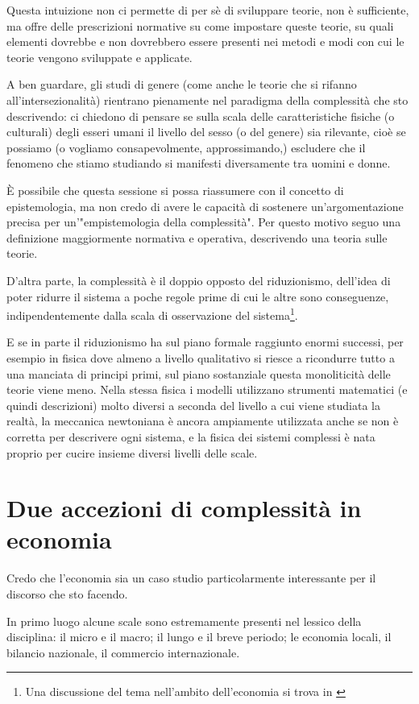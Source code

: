 \documentclass[a4paper, headings=standardclasses]{scrartcl}
\begin{document}
Questa intuizione non ci permette di per sè di sviluppare teorie, non è sufficiente, ma offre delle prescrizioni normative su come impostare queste teorie, su quali elementi dovrebbe e non dovrebbero essere presenti nei metodi e modi con cui le teorie vengono sviluppate e applicate.

A ben guardare, gli studi di genere (come anche le teorie che si rifanno all'intersezionalità) rientrano pienamente nel paradigma della complessità che sto descrivendo: ci chiedono di pensare se sulla scala delle caratteristiche fisiche (o culturali) degli esseri umani il livello del sesso (o del genere) sia rilevante, cioè se possiamo (o vogliamo consapevolmente, approssimando,) escludere che il fenomeno che stiamo studiando si manifesti diversamente tra uomini e donne.

È possibile che questa sessione si possa riassumere con il concetto di epistemologia, ma non credo di avere le capacità di sostenere un'argomentazione precisa per un'"empistemologia della complessità". Per questo motivo seguo una definizione maggiormente normativa e operativa, descrivendo una teoria sulle teorie.

D'altra parte, la complessità è il doppio opposto del riduzionismo, dell'idea di poter ridurre il sistema a poche regole prime di cui le altre sono conseguenze, indipendentemente dalla scala di osservazione del sistema\footnote{Una discussione del tema nell'ambito dell'economia si trova in \textcite{fontana2010}}.

E se in parte il riduzionismo ha sul piano formale raggiunto enormi successi, per esempio in fisica dove almeno a livello qualitativo si riesce a ricondurre tutto a una manciata di principi primi, sul piano sostanziale questa monoliticità delle teorie viene meno.
Nella stessa fisica i modelli utilizzano strumenti matematici (e quindi descrizioni) molto diversi a seconda del livello a cui viene studiata la realtà, la meccanica newtoniana è ancora ampiamente utilizzata anche se non è corretta per descrivere ogni sistema, e la fisica dei sistemi complessi è nata proprio per cucire insieme diversi livelli delle scale.

\section{Due accezioni di complessità in economia}
Credo che l'economia sia un caso studio particolarmente interessante per il discorso che sto facendo.

In primo luogo alcune scale sono estremamente presenti nel lessico della disciplina: il micro e il macro; il lungo e il breve periodo; le economia locali, il bilancio nazionale, il commercio internazionale.
\end{document}
